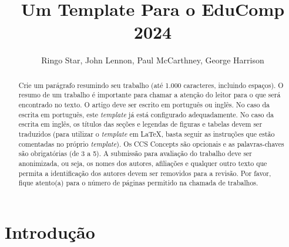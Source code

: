 \documentclass[sigconf]{educomp}
\begin{document}
\title[Título curto, caso necessário]{Um Template Para o EduComp 2024}


\author{Ringo Star, John Lennon, Paul McCarthney, George Harrison}

\renewcommand{\shortauthors}{}

\newcommand{\showDOI}[1]{\unskip}


\begin{abstract}
Crie um parágrafo resumindo seu trabalho (até 1.000 caracteres, incluindo espaços). O resumo de um trabalho é importante para chamar a atenção do leitor para o que será encontrado no texto. O artigo deve ser escrito em português ou inglês. No caso da escrita em português, este \textit{template} já está configurado adequadamente. No caso da escrita em inglês, os títulos das seções e legendas de figuras e tabelas devem ser traduzidos (para utilizar o \textit{template} em LaTeX, basta seguir as instruções que estão comentadas no próprio \textit{template}). Os CCS Concepts são opcionais e as palavras-chaves são obrigatórias (de 3 a 5). A submissão para avaliação do trabalho deve ser anonimizada, ou seja, os nomes dos autores, afiliações e qualquer outro texto que permita a identificação dos autores devem ser removidos para a revisão. Por favor, fique atento(a) para o número de páginas permitido na chamada de trabalhos.
\end{abstract}


\maketitle

\section{Introdução}
\end{document}

